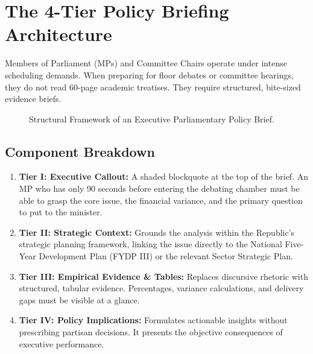 \documentclass[11pt, a4paper]{report}
\begin{document}
\section{The 4-Tier Policy Briefing Architecture}
Members of Parliament (MPs) and Committee Chairs operate under intense scheduling demands. When preparing for floor debates or committee hearings, they do not read 60-page academic treatises. They require structured, bite-sized evidence briefs.

\begin{figure}[htbp]
  \centering
  \caption{Structural Framework of an Executive Parliamentary Policy Brief.}
  \label{fig:policy_architecture}
\end{figure}

\subsection{Component Breakdown}
\begin{enumerate}[label=\textbf{\arabic*.}]
    \item \textbf{Tier I: Executive Callout:} A shaded blockquote at the top of the brief. An MP who has only 90 seconds before entering the debating chamber must be able to grasp the core issue, the financial variance, and the primary question to put to the minister.
    \item \textbf{Tier II: Strategic Context:} Grounds the analysis within the Republic's strategic planning framework, linking the issue directly to the National Five-Year Development Plan (FYDP III) or the relevant Sector Strategic Plan.
    \item \textbf{Tier III: Empirical Evidence \& Tables:} Replaces discursive rhetoric with structured, tabular evidence. Percentages, variance calculations, and delivery gaps must be visible at a glance.
    \item \textbf{Tier IV: Policy Implications:} Formulates actionable insights without prescribing partisan decisions. It presents the objective consequences of executive performance.
\end{enumerate}
\end{document}

